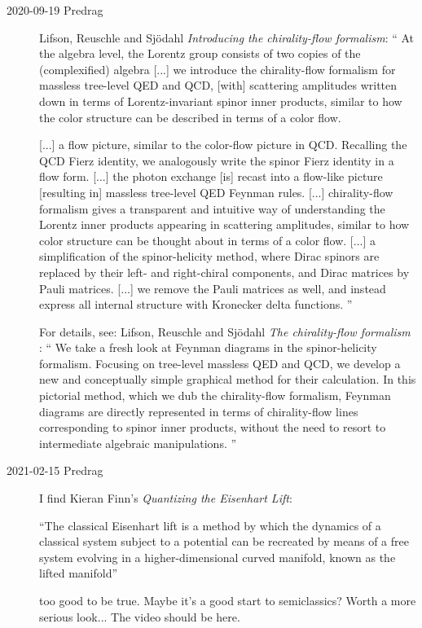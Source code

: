\begin{description}
\item[2020-09-19 Predrag]
Lifson, Reuschle and Sj{\"o}dahl
{\em Introducing the chirality-flow formalism}: ``
At the algebra level, the Lorentz group consists of two copies of the
(complexified)  algebra [...] we
introduce the chirality-flow formalism for massless tree-level QED and
QCD, [with] scattering amplitudes
 written down in terms of Lorentz-invariant spinor inner
products, similar to how the color structure can be described in terms of
a color flow.

[...] a flow picture, similar to the color-flow picture in QCD. Recalling
the QCD Fierz identity, we analogously write the spinor Fierz identity in
a flow form. [...] the photon exchange [is] recast into a flow-like
picture [resulting in] massless tree-level QED Feynman rules. [...]
chirality-flow formalism gives a transparent and intuitive way of
understanding the Lorentz inner products appearing in scattering
amplitudes, similar to how color structure can be thought about in terms
of a color flow. [...] a simplification of the spinor-helicity
method, where Dirac spinors are replaced by their left- and right-chiral
components, and Dirac matrices by Pauli matrices. [...] we
remove the Pauli matrices as well, and instead express all
internal structure with Kronecker delta functions.
''

For details, see:
Lifson, Reuschle and Sj{\"o}dahl
{\em The chirality-flow formalism} : ``
We take a fresh look at Feynman diagrams in the spinor-helicity
formalism. Focusing on tree-level massless QED and QCD, we develop a new
and conceptually simple graphical method for their calculation. In this
pictorial method, which we dub the chirality-flow formalism, Feynman
diagrams are directly represented in terms of chirality-flow lines
corresponding to spinor inner products, without the need to resort to
intermediate algebraic manipulations. ''

    \item[2021-02-15 Predrag]
I find Kieran Finn's
{{\em Quantizing the Eisenhart Lift}}:

``The classical Eisenhart lift is a method by which the dynamics of a
classical system subject to a potential can be recreated by means of a
free system evolving in a higher-dimensional curved manifold, known as
the lifted manifold''

too good to be true. Maybe it's a good start to semiclassics? Worth
a more serious look... The video should be
 {here}.


\end{description}
